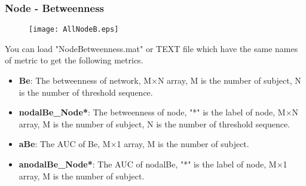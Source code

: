 \documentclass[11pt]{article}
\begin{document}
			\subsubsection{Node - Betweenness}
				\begin{figure}
					\begin{center}
						\texttt{[image: AllNodeB.eps]}
					\end{center}
				\end{figure}
				You can load "NodeBetweenness.mat" or TEXT file which have the same names of metric to get the following metrics.
				\begin{itemize}
					\item \textbf{Be}: The betweenness of network,
						M$\times$N array, M is the number of subject, N is the number of threshold sequence.
					\item \textbf{nodalBe\_Node*}: The betweenness of node, "*" is the label of node,
						M$\times$N array, M is the number of subject, N is the number of threshold sequence.
					\item \textbf{aBe}: The AUC of Be,
						M$\times$1 array, M is the number of subject.
					\item \textbf{anodalBe\_Node*}: The AUC of nodalBe, "*" is the label of node,
						M$\times$1 array, M is the number of subject.
				\end{itemize}
\end{document}
